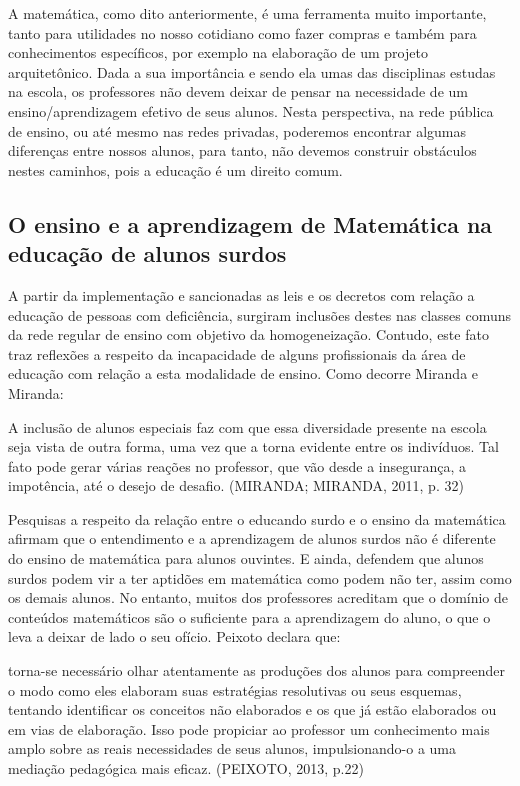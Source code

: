 \documentclass[brasil]{abnt}
\begin{document}
	A matemática, como dito anteriormente, é uma ferramenta muito importante, tanto para utilidades no nosso cotidiano como fazer compras e também para conhecimentos específicos, por exemplo na elaboração 
	de um projeto arquitetônico. Dada a sua importância e sendo ela umas das disciplinas estudas na escola, os professores não devem deixar de pensar na necessidade de um ensino/aprendizagem 
	efetivo de seus alunos. Nesta perspectiva, na rede pública de ensino, ou até mesmo nas redes privadas, poderemos encontrar algumas diferenças entre nossos alunos, para tanto, não devemos construir
	obstáculos nestes caminhos, pois a educação é um direito comum. 
	
 
\subsection{O ensino e a aprendizagem de Matemática na educação de alunos surdos}	
	A partir da implementação e sancionadas as leis e os decretos com relação a educação de pessoas com deficiência, surgiram inclusões destes nas classes comuns da rede regular de ensino com objetivo da 
	homogeneização. Contudo, este fato traz reflexões a respeito da incapacidade de alguns profissionais da área de educação com relação a esta modalidade de ensino. Como decorre Miranda e Miranda:
		                 
			\begin{citacao} A inclusão de alunos especiais faz com que essa diversidade presente na escola seja vista de outra forma, uma vez que a torna evidente entre os indivíduos. Tal fato pode gerar 
							várias reações no professor, que vão desde a insegurança, a impotência, até o desejo de desafio. (MIRANDA; MIRANDA, 2011, p. 32)   			
			\end{citacao}
						
	Pesquisas a respeito da relação entre o educando surdo e o ensino da matemática afirmam que o entendimento e a aprendizagem de alunos surdos não é diferente do ensino de matemática para alunos ouvintes. 
	E ainda, defendem que alunos surdos podem vir a ter aptidões em matemática como podem não ter, assim como os demais alunos. No entanto, muitos dos professores acreditam que o domínio de conteúdos 
	matemáticos são o suficiente para a aprendizagem do aluno, o que o leva a deixar de lado o seu ofício. Peixoto declara que:
	
		\begin{citacao}[...] torna-se necessário olhar atentamente as produções dos alunos para compreender o modo como eles elaboram suas estratégias resolutivas ou seus esquemas, tentando identificar 
						os conceitos não elaborados e os que já estão elaborados ou em vias de elaboração. Isso pode propiciar ao professor um conhecimento mais amplo sobre as reais necessidades de seus 
						alunos, impulsionando-o a uma mediação pedagógica mais eficaz. (PEIXOTO, 2013, p.22)
		\end{citacao}
	
\end{document}

